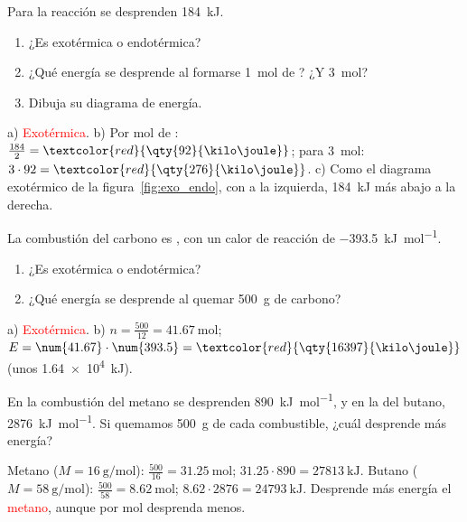 \begin{exercise}
    Para la reacción  se desprenden \qty{184}{\kilo\joule}.
    \begin{enumerate}[label=\alph*)]
        \item ¿Es exotérmica o endotérmica?
        \item ¿Qué energía se desprende al formarse \qty{1}{\mol} de ? ¿Y \qty{3}{\mol}?
        \item Dibuja su diagrama de energía.
    \end{enumerate}
    \begin{solu}
        a) \textcolor{red}{Exotérmica}. b) Por mol de : \(\frac{184}{2} = \textcolor{red}{\qty{92}{\kilo\joule}}\); para \qty{3}{\mol}: \(3 \cdot 92 = \textcolor{red}{\qty{276}{\kilo\joule}}\). c) Como el diagrama exotérmico de la figura~\ref{fig:exo_endo}, con  a la izquierda,  \qty{184}{\kilo\joule} más abajo a la derecha.
    \end{solu}
\end{exercise}

\begin{exercise}
    La combustión del carbono es , con un calor de reacción de \qty{-393.5}{\kilo\joule\per\mol}.
    \begin{enumerate}[label=\alph*)]
        \item ¿Es exotérmica o endotérmica?
        \item ¿Qué energía se desprende al quemar \qty{500}{\gram} de carbono?
    \end{enumerate}
    \begin{solu}
        a) \textcolor{red}{Exotérmica}. b) \(n = \frac{500}{12} = \qty{41.67}{\mol}\); \(E = \num{41.67} \cdot \num{393.5} = \textcolor{red}{\qty{16397}{\kilo\joule}}\) (unos \qty{1.64e4}{\kilo\joule}).
    \end{solu}
\end{exercise}

\begin{exercise}
    En la combustión del metano se desprenden \qty{890}{\kilo\joule\per\mol}, y en la del butano, \qty{2876}{\kilo\joule\per\mol}. Si quemamos \qty{500}{\gram} de cada combustible, ¿cuál desprende más energía?
    \begin{solu}
        Metano (\(M = \qty{16}{\gram\per\mol}\)): \(\frac{500}{16} = \qty{31.25}{\mol}\); \(\num{31.25} \cdot 890 = \qty{27813}{\kilo\joule}\).
        Butano (\(M = \qty{58}{\gram\per\mol}\)): \(\frac{500}{58} = \qty{8.62}{\mol}\); \(\num{8.62} \cdot 2876 = \qty{24793}{\kilo\joule}\).
        Desprende más energía el \textcolor{red}{metano}, aunque por mol desprenda menos.
    \end{solu}
\end{exercise}

